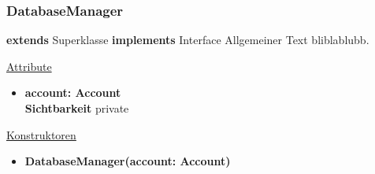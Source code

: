 \subsubsection{DatabaseManager} \label{service:klasse:DatabaseManager}
\textbf{extends} Superklasse \newline
\textbf{implements} Interface \newline
Allgemeiner Text bliblablubb. \newline

\underline{Attribute}
\begin{itemize}
\itemsep0pt
\item \textbf{account: Account} \hfill\\ 
\textbf{Sichtbarkeit} private
\end{itemize}

\underline{Konstruktoren}
\begin{itemize}
\itemsep0pt
\item \textbf{DatabaseManager(account: Account)} \hfill\\
\end{itemize}

